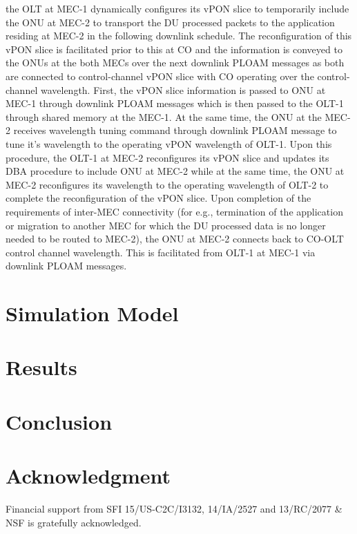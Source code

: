 \documentclass[a4paper, oneside, twocolumn, notitlepage, 10pt]{extarticle_ecoc}
\begin{document}
	 the OLT at MEC-1 dynamically configures its vPON slice to temporarily include the ONU at MEC-2 to transport the DU processed packets to the application residing at MEC-2 in the following downlink schedule. The reconfiguration of this vPON slice is facilitated prior to this at CO and the information is conveyed to the ONUs at the both MECs over the next downlink PLOAM messages as both are connected to control-channel vPON slice with CO operating over the control-channel wavelength. First, the vPON slice information is passed to ONU at MEC-1 through downlink PLOAM messages which is then passed to the OLT-1 through shared memory at the MEC-1. At the same time, the ONU at the MEC-2 receives wavelength tuning command through downlink PLOAM message to tune it's wavelength to the operating vPON wavelength of OLT-1. Upon this procedure, the OLT-1 at MEC-2 reconfigures its vPON slice and updates its DBA procedure to include ONU at MEC-2 while at the same time, the ONU at MEC-2 reconfigures its wavelength to the operating wavelength of OLT-2 to complete the reconfiguration of the vPON slice. Upon completion of the requirements of inter-MEC connectivity (for e.g., termination of the application or migration to another MEC for which the DU processed data is no longer needed to be routed to MEC-2), the ONU at MEC-2 connects back to CO-OLT control channel wavelength. This is facilitated from OLT-1 at MEC-1 via downlink PLOAM messages.
	 

    
\section{Simulation Model} \label{sec:SimulationModel}


\section{Results} \label{sec:Results}


\section{Conclusion} \label{sec:Conclusion}


\section*{Acknowledgment} \label{sec:Acknowledgment}
	Financial support from SFI 15/US-C2C/I3132, 14/IA/2527 and 13/RC/2077 \& NSF is gratefully acknowledged.
\end{document}

